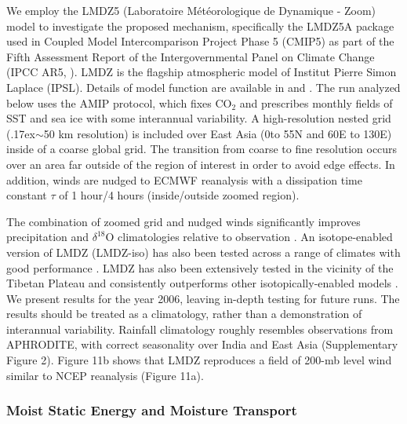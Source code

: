 \documentclass[12pt]{article}
\newcommand{\mytilde}{\raise.17ex\hbox{$\scriptstyle\mathtt{\sim}$}}	%
\begin{document}
	We employ the LMDZ5 (Laboratoire M\'et\'eorologique de Dynamique - Zoom) model to investigate the proposed mechanism, specifically the LMDZ5A package used in Coupled Model Intercomparison Project Phase 5 (CMIP5) as part of the Fifth Assessment Report of the Intergovernmental Panel on Climate Change (IPCC AR5, \cite{Christensen2011}). LMDZ is the flagship atmospheric model of Institut Pierre Simon Laplace (IPSL). Details of model function are available in \cite{Hourdin2006} and \cite{Hourdin2012}. The run analyzed below uses the AMIP protocol, which fixes CO$_\mathrm{2}$ and prescribes monthly fields of SST and sea ice with some interannual variability. A high-resolution nested grid (\mytilde50 km resolution) is included over East Asia (0\textdegree to 55\textdegree N and 60\textdegree E to 130\textdegree E) inside of a coarse global grid. The transition from coarse to fine resolution occurs over an area far outside of the region of interest in order to avoid edge effects. In addition, winds are nudged to ECMWF reanalysis with a dissipation time constant $\tau$ of 1 hour/4 hours (inside/outside zoomed region). 
	
	The combination of zoomed grid and nudged winds significantly improves precipitation and $\delta^{18}$O climatologies relative to observation \citep{Gao2011}. An isotope-enabled version of LMDZ (LMDZ-iso) has also been tested across a range of climates with good performance \citep{Risi2010}. LMDZ has also been extensively tested in the vicinity of the Tibetan Plateau and consistently outperforms other isotopically-enabled models \citep{Gao2011,Lee2012,Eagle2013,Gao2013,Yao2013}. We present  results for the year 2006, leaving in-depth testing for future runs. The results should be treated as a climatology, rather than a demonstration of interannual variability. Rainfall climatology roughly resembles observations from APHRODITE, with correct seasonality over India and East Asia (Supplementary Figure 2). Figure 11b shows that LMDZ reproduces a field of 200-mb level wind similar to NCEP reanalysis (Figure 11a).
	
\subsubsection{Moist Static Energy and Moisture Transport}
	
\end{document}
